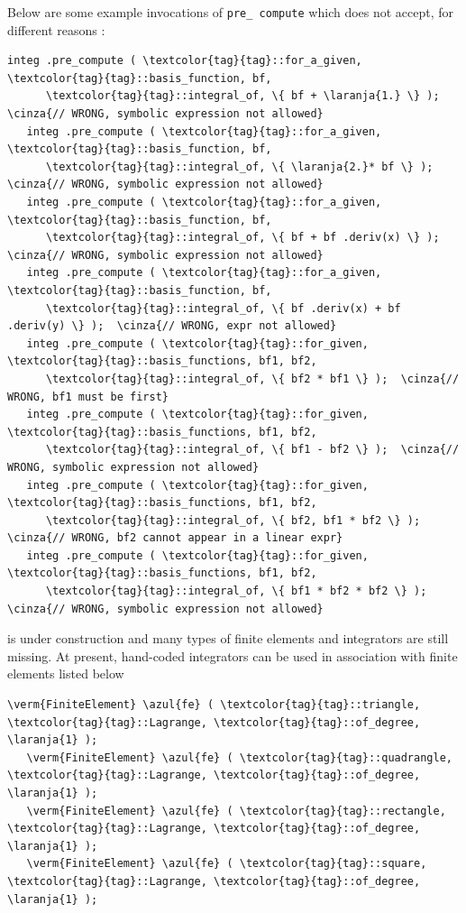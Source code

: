 Below are some example invocations of {\small\tt pre\_\,compute} which {\maniFEM} does not accept,
for different reasons :

\begin{Verbatim}[commandchars=\\\{\},formatcom=\small\tt,
   baselinestretch=0.94,framesep=2mm                      ]
   integ .pre_compute ( \textcolor{tag}{tag}::for_a_given, \textcolor{tag}{tag}::basis_function, bf,
      \textcolor{tag}{tag}::integral_of, \{ bf + \laranja{1.} \} );  \cinza{// WRONG, symbolic expression not allowed}
   integ .pre_compute ( \textcolor{tag}{tag}::for_a_given, \textcolor{tag}{tag}::basis_function, bf,
      \textcolor{tag}{tag}::integral_of, \{ \laranja{2.}* bf \} );  \cinza{// WRONG, symbolic expression not allowed}
   integ .pre_compute ( \textcolor{tag}{tag}::for_a_given, \textcolor{tag}{tag}::basis_function, bf,
      \textcolor{tag}{tag}::integral_of, \{ bf + bf .deriv(x) \} );  \cinza{// WRONG, symbolic expression not allowed}
   integ .pre_compute ( \textcolor{tag}{tag}::for_a_given, \textcolor{tag}{tag}::basis_function, bf,
      \textcolor{tag}{tag}::integral_of, \{ bf .deriv(x) + bf .deriv(y) \} );  \cinza{// WRONG, expr not allowed}
   integ .pre_compute ( \textcolor{tag}{tag}::for_given, \textcolor{tag}{tag}::basis_functions, bf1, bf2,
      \textcolor{tag}{tag}::integral_of, \{ bf2 * bf1 \} );  \cinza{// WRONG, bf1 must be first}
   integ .pre_compute ( \textcolor{tag}{tag}::for_given, \textcolor{tag}{tag}::basis_functions, bf1, bf2,
      \textcolor{tag}{tag}::integral_of, \{ bf1 - bf2 \} );  \cinza{// WRONG, symbolic expression not allowed}
   integ .pre_compute ( \textcolor{tag}{tag}::for_given, \textcolor{tag}{tag}::basis_functions, bf1, bf2,
      \textcolor{tag}{tag}::integral_of, \{ bf2, bf1 * bf2 \} );  \cinza{// WRONG, bf2 cannot appear in a linear expr}
   integ .pre_compute ( \textcolor{tag}{tag}::for_given, \textcolor{tag}{tag}::basis_functions, bf1, bf2,
      \textcolor{tag}{tag}::integral_of, \{ bf1 * bf2 * bf2 \} );  \cinza{// WRONG, symbolic expression not allowed}
\end{Verbatim}

{\ManiFEM} is under construction and many types of finite elements and integrators are
still missing.
At present, hand-coded integrators can be used in association with finite elements listed below
\begin{Verbatim}[commandchars=\\\{\},formatcom=\small\tt,
   baselinestretch=0.94,framesep=2mm                      ]
   \verm{FiniteElement} \azul{fe} ( \textcolor{tag}{tag}::triangle,   \textcolor{tag}{tag}::Lagrange, \textcolor{tag}{tag}::of_degree, \laranja{1} );
   \verm{FiniteElement} \azul{fe} ( \textcolor{tag}{tag}::quadrangle, \textcolor{tag}{tag}::Lagrange, \textcolor{tag}{tag}::of_degree, \laranja{1} );
   \verm{FiniteElement} \azul{fe} ( \textcolor{tag}{tag}::rectangle,  \textcolor{tag}{tag}::Lagrange, \textcolor{tag}{tag}::of_degree, \laranja{1} );
   \verm{FiniteElement} \azul{fe} ( \textcolor{tag}{tag}::square,     \textcolor{tag}{tag}::Lagrange, \textcolor{tag}{tag}::of_degree, \laranja{1} );
\end{Verbatim}

